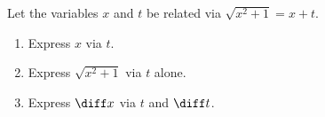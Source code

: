\label{problemEulerSub-case1-cot(2arctant)-alternative-exposition}
Let the variables $x$ and $t$ be related via $\sqrt{x^2+1}=x+t$.
\begin{enumerate}[ref={\fcProblemRef}]
\item \label{problemEulerSub-case1-cot(2arctant)-alternative-exposition-x-via-t} Express $x$ via $t$.
\item \label{problemEulerSub-case1-cot(2arctant)-alternative-exposition-radical-via-t} Express $\sqrt{x^2+1}$ via $t$ alone.
\item Express $\diff x$ via $t$ and $\diff t$.
\end{enumerate}